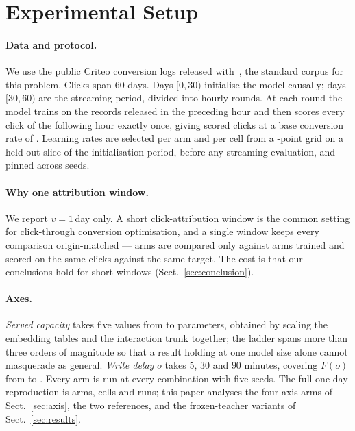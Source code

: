 \section{Experimental Setup}
\label{sec:setup}

\paragraph{Data and protocol.} We use the public Criteo conversion logs released
with~\cite{chapelle2014modeling}, the standard corpus for this problem. Clicks span 60 days.
Days $[0,30)$ initialise the model causally; days $[30,60)$ are the streaming period, divided
into \nCohorts{} hourly rounds. At each round the model trains on the records released in the
preceding hour and then scores every click of the following hour exactly once, giving
\nEval{} scored clicks at a base conversion rate of \baseRate{}. Learning rates are selected per
arm and per cell from a \nLr{}-point grid on a held-out slice of the initialisation period,
before any streaming evaluation, and pinned across seeds.

\paragraph{Why one attribution window.} We report $v=1$\,day only. A short click-attribution
window is the common setting for click-through conversion optimisation, and a single window
keeps every comparison origin-matched --- arms are compared only against arms trained and
scored on the same clicks against the same target. The cost is that our conclusions hold for
short windows (Sect.~\ref{sec:conclusion}).

\paragraph{Axes.} \emph{Served capacity} takes five values from \capMin{} to
\capMax{} parameters, obtained by scaling the embedding tables and the interaction trunk
together; the ladder spans more than three orders of magnitude so that a result holding at one model
size alone cannot masquerade as general. \emph{Write delay} $o$ takes $5$, $30$ and $90$ minutes,
covering $F(o)$ from \foFive{} to \foNinety{}. Every arm is run at every combination with five seeds. The full one-day reproduction is
\nArms{} arms, \nCells{} cells and \nRuns{} runs; this paper analyses the four axis arms of
Sect.~\ref{sec:axis}, the two references, and the frozen-teacher variants of
Sect.~\ref{sec:results}.

